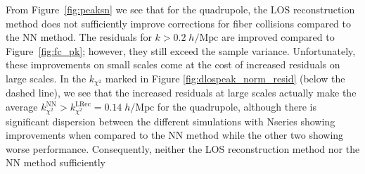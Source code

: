                                                                                                                                                                                                                                                                          From Figure~\ref{fig:peaksn} we see that for the quadrupole, the LOS reconstruction method does not 
                                                                                                                                                                                                                                                                         sufficiently improve corrections for fiber collisions compared to the NN method.
                                                                                                                                                                                                                                                                         The residuals for $k > 0.2\;h/\mathrm{Mpc}$ are improved compared to Figure~\ref{fig:fc_pk}; however, they 
                                                                                                                                                                                                                                                                         still exceed the sample variance. Unfortunately, these improvements on small scales
                                                                                                                                                                                                                                                                         come at the cost of increased residuals on large scales. In the $k_{\chi^2}$ marked 
                                                                                                                                                                                                                                                                         in Figure \ref{fig:dlospeak_norm_resid} (below the dashed line), we see that the
                                                                                                                                                                                                                                                                         increased residuals at large scales actually make the average $k_{\chi^2}^\mathrm{NN} > 
                                                                                                                                                                                                                                                                         k_{\chi^2}^\mathrm{LRec} = 0.14\;h/\mathrm{Mpc}$ for the quadrupole, although there is significant dispersion between the different simulations with Nseries showing improvements when compared to the NN method while the other two showing worse performance. Consequently, neither the LOS reconstruction method nor the NN method sufficiently 
